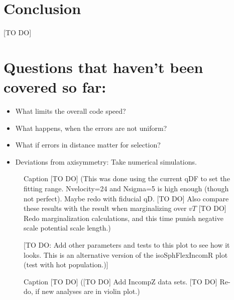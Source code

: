 \documentclass[12pt,preprint]{aastex}
\begin{document}
\section{Conclusion}

[TO DO]

\section{Questions that haven't been covered so far:}

\begin{itemize}
\item What limits the overall code speed?
\item What happens, when the errors are not uniform?
\item What if errors in distance matter for selection?
\item Deviations from axisymmetry: Take numerical simulations.
\end{itemize}







\begin{figure}
\caption{Caption [TO DO] (This was done using the current qDF to set the fitting range. Nvelocity=24 and Nsigma=5 is high enough (though not perfect). Maybe redo with fiducial qD. [TO DO] Also compare these results with the result when marginalizing over $vT$ [TO DO] Redo marginalization calculations, and this time punish negative scale potential scale length.)} 
\end{figure}

\begin{figure}
\caption{[TO DO: Add other parameters and tests to this plot to see how it looks. This is an alternative version of the isoSphFlexIncomR plot (test with hot population.)]} 
\end{figure}

\begin{figure}
\caption{Caption [TO DO] ([TO DO] Add IncompZ data sets. [TO DO] Re-do, if new analyses are in violin plot.)} 
\end{figure}
\end{document}
